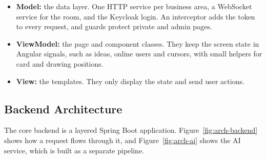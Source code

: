 \documentclass[12pt,a4paper]{report}
\begin{document}
\begin{itemize}
  \item \textbf{Model:} the data layer. One HTTP service per business area, a WebSocket service for the room, and the Keycloak login. An interceptor adds the token to every request, and guards protect private and admin pages.
  \item \textbf{ViewModel:} the page and component classes. They keep the screen state in Angular signals, such as ideas, online users and cursors, with small helpers for card and drawing positions.
  \item \textbf{View:} the templates. They only display the state and send user actions.
\end{itemize}

\subsection{Backend Architecture}
\label{subsec:arch-backend}

The core backend is a layered Spring Boot application. Figure~\ref{fig:arch-backend} shows how a request flows through it, and Figure~\ref{fig:arch-ai} shows the AI service, which is built as a separate pipeline.
\end{document}
